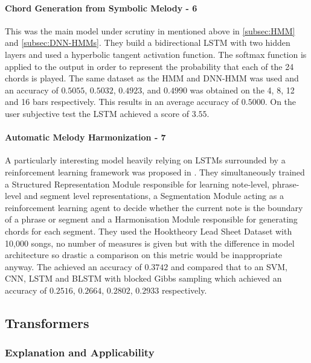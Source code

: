 \paragraph{Chord Generation from Symbolic Melody - 6} This was the main model under scrutiny in \cite{BLSTM} mentioned above in \cref{subsec:HMM} and \cref{subsec:DNN-HMMs}.
They build a bidirectional LSTM with two hidden layers and used a hyperbolic tangent activation function. The softmax function is applied to the output in order to represent the probability that each of the 24 chords is played.
The same dataset as the HMM and DNN-HMM was used and an accuracy of $0.5055$, $0.5032$, $0.4923$, and $0.4990$  was obtained on the 4, 8, 12 and 16 bars respectively. This results in an average accuracy of $0.5000$.
On the user subjective test the LSTM achieved a score of $3.55$.

\paragraph{Automatic Melody Harmonization - 7} A particularly interesting model heavily relying on LSTMs surrounded by a reinforcement learning framework was proposed in \cite{ReinforcementLearning}.
They simultaneously trained a Structured Representation Module responsible for learning note-level, phrase-level and segment level representations, a Segmentation Module acting as a reinforcement learning agent to decide whether the current note is the boundary of a phrase or segment and a Harmonisation Module responsible for generating chords for each segment.
They used the Hooktheory Lead Sheet Dataset with 10,000 songs, no number of measures is given but with the difference in model architecture so drastic a comparison on this metric would be inappropriate anyway.
The achieved an accuracy of $0.3742$ and compared that to an SVM, CNN, LSTM and BLSTM with blocked Gibbs sampling which achieved an accuracy of $0.2516$, $0.2664$, $0.2802$, $0.2933$ respectively.

\subsection{Transformers}
\label{sec:ModelTransformers}
\subsubsection{Explanation and Applicability}

